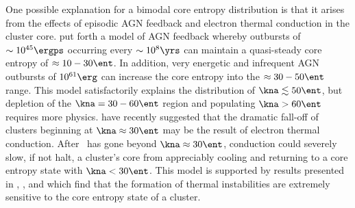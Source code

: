 \documentclass[apj]{emulateapj}
\begin{document}
One possible explanation for a bimodal core entropy distribution is
that it arises from the effects of episodic AGN feedback and electron
thermal conduction in the cluster core. \citet{agnframework} put forth
a model of AGN feedback whereby outbursts of $\sim 10^{45} \ergps$
occurring every $\sim 10^8 \yrs$ can maintain a quasi-steady core
entropy of $\approx 10-30 \ent$. In addition, very energetic and
infrequent AGN outbursts of $10^{61} \erg$ can increase the core
entropy into the $\approx 30-50 \ent$ range. This model satisfactorily
explains the distribution of $\kna \lesssim 50 \ent$, but depletion of
the $\kna = 30-60 \ent$ region and populating $\kna > 60 \ent$
requires more physics. \citet{conduction} have recently suggested that
the dramatic fall-off of clusters beginning at $\kna \approx 30 \ent$
may be the result of electron thermal conduction. After \kna\ has gone
beyond $\kna \approx 30 \ent$, conduction could severely slow, if not
halt, a cluster's core from appreciably cooling and returning to a
core entropy state with $\kna < 30 \ent$. This model is supported by
results presented in \citet{haradent}, \citet{2008arXiv0804.3823G},
and \citet{2008arXiv0802.1864R} which find that the formation of
thermal instabilities are extremely sensitive to the core entropy
state of a cluster.

\end{document}
